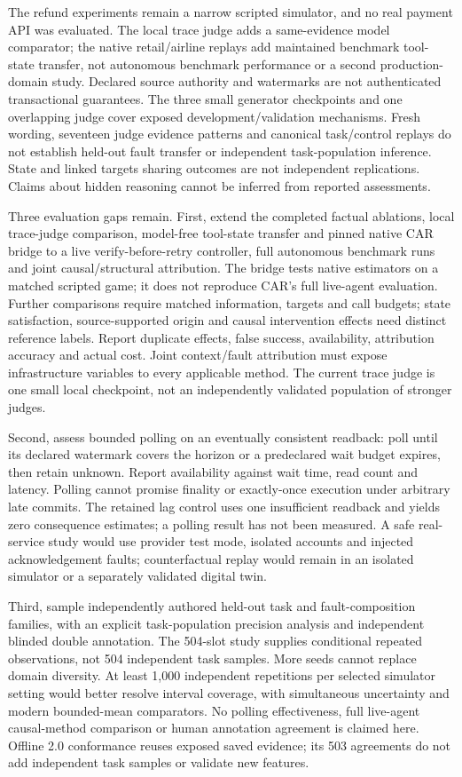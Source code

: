 \documentclass[conference]{IEEEtran}
\begin{document}
The refund experiments remain a narrow scripted simulator, and no real payment
API was evaluated. The local trace judge adds a same-evidence model comparator;
the native retail/airline replays add maintained benchmark tool-state transfer,
not autonomous benchmark performance or a second production-domain study.
Declared source authority and watermarks are not authenticated transactional
guarantees. The three small generator checkpoints and one overlapping judge
cover exposed development/validation mechanisms. Fresh wording, seventeen
judge evidence patterns and canonical task/control replays do not establish
held-out fault transfer or independent task-population inference. State and
linked targets sharing outcomes are not independent replications. Claims
about hidden reasoning cannot be inferred from reported assessments.

Three evaluation gaps remain. First, extend the completed factual ablations,
local trace-judge comparison, model-free tool-state transfer and pinned
native CAR bridge to a live verify-before-retry controller, full autonomous
benchmark runs and joint causal/structural attribution. The bridge tests
native estimators on a matched scripted game; it does not reproduce CAR's
full live-agent evaluation. Further comparisons require matched information,
targets and call budgets; state satisfaction, source-supported origin and
causal intervention effects need distinct reference labels. Report duplicate
effects, false success, availability, attribution accuracy and actual cost.
Joint context/fault attribution must expose infrastructure variables to every
applicable method. The current trace judge is one small local checkpoint,
not an independently validated population of stronger judges.

Second, assess bounded polling on an eventually consistent readback: poll
until its declared watermark covers the horizon or a predeclared wait budget
expires, then retain unknown. Report availability against wait time, read
count and latency. Polling cannot promise finality or exactly-once execution
under arbitrary late commits. The retained lag control uses one insufficient
readback and yields zero consequence estimates; a polling result has not been
measured. A safe real-service study would use provider test mode, isolated
accounts and injected acknowledgement faults; counterfactual replay would
remain in an isolated simulator or a separately validated digital twin.

Third, sample independently authored held-out task and fault-composition
families, with an explicit task-population precision analysis and independent
blinded double annotation. The 504-slot study supplies conditional repeated
observations, not 504 independent task samples. More seeds cannot replace
domain diversity. At least 1,000 independent repetitions per selected
simulator setting would better resolve interval coverage, with simultaneous
uncertainty and modern bounded-mean comparators. No polling effectiveness,
full live-agent causal-method comparison or human annotation agreement is
claimed here. Offline 2.0 conformance reuses exposed saved evidence; its
503 agreements do not add independent task samples or validate new features.
\end{document}
